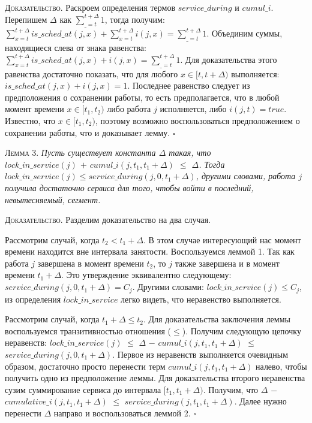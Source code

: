 \documentclass[14pt]{matmex-diploma-custom}
\begin{document}
\textsc{Доказательство.} 
  Раскроем определения термов $service\_during$ и $cumul\_i $. 
  Перепишем $\Delta$ как $\sum_{\_ = t}^{t+\Delta}1$, тогда получим: 
    $\sum_{x = t}^{t+\Delta} is\_sched\_at(j,x) + \sum_{x = t}^{t+\Delta} i(j,x) = \sum_{\_ = t}^{t+\Delta} 1 $.
  Объединим суммы, находящиеся слева от знака равенства: 
    $\sum_{x = t}^{t+\Delta} is\_sched\_at(j,x) + i(j,x) = \sum_{\_ = t}^{t+\Delta} 1 $.
  Для доказательства этого равенства достаточно показать, что для любого $x \in [t, t + \Delta)$ выполняется: 
    $is\_sched\_at(j,x) + i(j,x) = 1$.
  Последнее равенство следует из предположения о сохранении работы, то есть предполагается, что в любой момент времени $x \in [t_1, t_2)$ либо работа $j$ исполняется, либо $i(j,t) = true$. Известно, что $x \in [t_1, t_2)$, поэтому возможно 
  воспользоваться предположением о сохранении работы, что и доказывает лемму. $\square$
  
\textsc{Лемма 3.}
\textit{Пусть существует константа $\Delta$ такая, что \\ $ lock\_in\_service(j)$ $+$ $cumul\_i(j, t_1, t_1 + \Delta) $ $\leq$ $ \Delta$. Тогда $lock\_in\_service(j) \leq service\_during(j, 0, t_1 + \Delta)$, другими словами, работа $j$ получила достаточно сервиса для того, чтобы войти в последний, невытесняемый, сегмент. }

\textsc{Доказательство.} Разделим доказательство на два случая.

Рассмотрим случай, когда \textit{$t_2 < t_1 + \Delta$}. В этом случае интересующий нас момент времени находится вне интервала занятости. Воспользуемся леммой 1. Так как работа $j$ завершена в момент времени $t_2$, то $j$ также завершена и в момент времени $t_1 + \Delta$. Это утверждение эквивалентно следующему: $service\_during(j, 0, t_1 + \Delta) = C_{j}$. Другими словами: $lock\_in\_service(j) \leq C_{j}$, из определения $lock\_in\_service$ легко видеть, что неравенство выполняется.

Рассмотрим случай, когда \textit{$t_1 + \Delta \leq t_2$}. Для доказательства заключения леммы воспользуемся транзитивностью отношения ($\leq$). Получим следующую цепочку неравенств: 
  $lock\_in\_service(j) $ $\leq$ $ \Delta$ $-$ $cumul\_i(j, t_1, t_1 + \Delta)$ $\leq$ $service\_during(j, 0, t_1 + \Delta)$.
  Первое из неравенств выполняется очевидным образом, достаточно просто перенести терм 
  $cumul\_i(j, t_1, t_1 + \Delta)$ налево, чтобы получить одно из предположение леммы. 
  Для доказательства второго неравенства сузим суммирование сервиса до интервала $[t_1, t_1 + \Delta)$. 
  Получим, что $ \Delta$ $-$ $cumulative\_i(j, t_1, t_1 + \Delta)$ $\leq$ $service\_during(j, t_1, t_1 + \Delta)$.
  Далее нужно перенести $\Delta$ направо и воспользоваться леммой 2. $\square$
\end{document}
